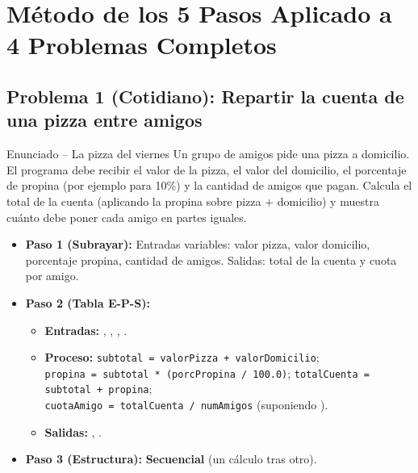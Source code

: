 \documentclass[11pt,letterpaper]{article}
\begin{document}
\section{Método de los 5 Pasos Aplicado a 4 Problemas Completos}

\subsection{Problema 1 (Cotidiano): Repartir la cuenta de una pizza entre amigos}
\begin{analisis}{Enunciado -- La pizza del viernes}
Un grupo de amigos pide una pizza a domicilio. El programa debe recibir el valor de la pizza, el valor del domicilio, el porcentaje de propina (por ejemplo  para 10\%) y la cantidad de amigos que pagan. Calcula el total de la cuenta (aplicando la propina sobre pizza + domicilio) y muestra cuánto debe poner cada amigo en partes iguales.
\end{analisis}

\begin{itemize}
  \item \textbf{Paso 1 (Subrayar):} Entradas variables: valor pizza, valor domicilio, porcentaje propina, cantidad de amigos. Salidas: total de la cuenta y cuota por amigo.
  \item \textbf{Paso 2 (Tabla E-P-S):}
    \begin{itemize}
      \item \textbf{Entradas:} , , , .
      \item \textbf{Proceso:} \texttt{subtotal = valorPizza + valorDomicilio};\\
            \texttt{propina = subtotal * (porcPropina / 100.0)}; \texttt{totalCuenta = subtotal + propina};\\
            \texttt{cuotaAmigo = totalCuenta / numAmigos} (suponiendo ).
      \item \textbf{Salidas:} , .
    \end{itemize}
  \item \textbf{Paso 3 (Estructura):} \textbf{Secuencial} (un cálculo tras otro).
\end{itemize}
\end{document}
